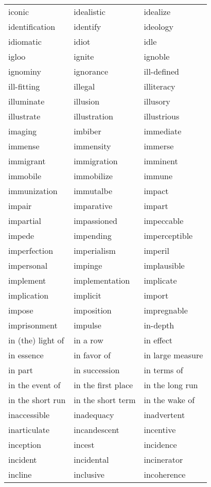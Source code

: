 \documentclass{minimal}
\begin{document}
\begin{longtable}{p{2.7cm}@{\hskip 0.2cm}p{2.7cm}@{\hskip 0.2cm}p{2.7cm}}
iconic & idealistic & idealize \\
identification & identify & ideology \\
idiomatic & idiot & idle \\
igloo & ignite & ignoble \\
ignominy & ignorance & ill-defined \\
ill-fitting & illegal & illiteracy \\
illuminate & illusion & illusory \\
illustrate & illustration & illustrious \\
imaging & imbiber & immediate \\
immense & immensity & immerse \\
immigrant & immigration & imminent \\
immobile & immobilize & immune \\
immunization & immutalbe & impact \\
impair & imparative & impart \\
impartial & impassioned & impeccable \\
impede & impending & imperceptible \\
imperfection & imperialism & imperil \\
impersonal & impinge & implausible \\
implement & implementation & implicate \\
implication & implicit & import \\
impose & imposition & impregnable \\
imprisonment & impulse & in-depth \\
in (the) light of & in a row & in effect \\
in essence & in favor of & in large measure \\
in part & in succession & in terms of \\
in the event of & in the first place & in the long run \\
in the short run & in the short term & in the wake of \\
inaccessible & inadequacy & inadvertent \\
inarticulate & incandescent & incentive \\
inception & incest & incidence \\
incident & incidental & incinerator \\
incline & inclusive & incoherence \\

\end{longtable}
\end{document}
